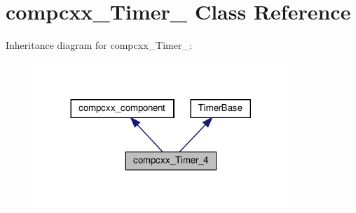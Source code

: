 \hypertarget{classcompcxx__Timer__4}{}\section{compcxx\+\_\+\+Timer\+\_ Class Reference}
\label{classcompcxx__Timer__4}


Inheritance diagram for compcxx\+\_\+\+Timer\+\_\+:\nopagebreak
\begin{figure}[H]
\begin{center}
\leavevmode
\includegraphics[width=272pt]{classcompcxx__Timer__4__inherit__graph}
\end{center}
\end{figure}


